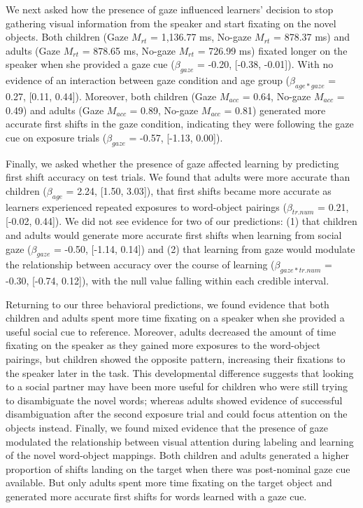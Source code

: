 \documentclass[10pt, letterpaper]{article}
\begin{document}
We next asked how the presence of gaze influenced learners' decision to
stop gathering visual information from the speaker and start fixating on
the novel objects. Both children (Gaze \(M_{rt}\) = 1,136.77 ms, No-gaze
\(M_{rt}\) = 878.37 ms) and adults (Gaze \(M_{rt}\) = 878.65 ms, No-gaze
\(M_{rt}\) = 726.99 ms) fixated longer on the speaker when she provided
a gaze cue (\(\beta_{gaze}\) = -0.20, {[}-0.38, -0.01{]}). With no
evidence of an interaction between gaze condition and age group
(\(\beta_{age*gaze}\) = 0.27, {[}0.11, 0.44{]}). Moreover, both children
(Gaze \(M_{acc}\) = 0.64, No-gaze \(M_{acc}\) = 0.49) and adults (Gaze
\(M_{acc}\) = 0.89, No-gaze \(M_{acc}\) = 0.81) generated more accurate
first shifts in the gaze condition, indicating they were following the
gaze cue on exposure trials (\(\beta_{gaze}\) = -0.57, {[}-1.13,
0.00{]}).

Finally, we asked whether the presence of gaze affected learning by
predicting first shift accuracy on test trials. We found that adults
were more accurate than children (\(\beta_{age}\) = 2.24, {[}1.50,
3.03{]}), that first shifts became more accurate as learners experienced
repeated exposures to word-object pairings (\(\beta_{tr.num}\) = 0.21,
{[}-0.02, 0.44{]}). We did not see evidence for two of our predictions:
(1) that children and adults would generate more accurate first shifts
when learning from social gaze (\(\beta_{gaze}\) = -0.50, {[}-1.14,
0.14{]}) and (2) that learning from gaze would modulate the relationship
between accuracy over the course of learning (\(\beta_{gaze*tr.num}\) =
-0.30, {[}-0.74, 0.12{]}), with the null value falling within each
credible interval.

Returning to our three behavioral predictions, we found evidence that
both children and adults spent more time fixating on a speaker when she
provided a useful social cue to reference. Moreover, adults decreased
the amount of time fixating on the speaker as they gained more exposures
to the word-object pairings, but children showed the opposite pattern,
increasing their fixations to the speaker later in the task. This
developmental difference suggests that looking to a social partner may
have been more useful for children who were still trying to disambiguate
the novel words; whereas adults showed evidence of successful
disambiguation after the second exposure trial and could focus attention
on the objects instead. Finally, we found mixed evidence that the
presence of gaze modulated the relationship between visual attention
during labeling and learning of the novel word-object mappings. Both
children and adults generated a higher proportion of shifts landing on
the target when there was post-nominal gaze cue available. But only
adults spent more time fixating on the target object and generated more
accurate first shifts for words learned with a gaze cue.
\end{document}
